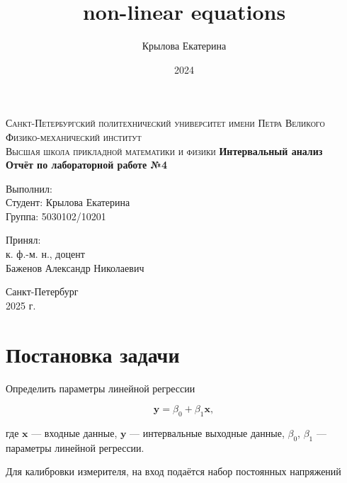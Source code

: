 \documentclass[a4paper,14pt]{article}
\title{non-linear equations}
\author{Крылова Екатерина}
\date{2024}
\begin{document}
	
	\begin{titlepage}
		\begin{center}
			\textsc{
				Санкт-Петербургский политехнический университет имени Петра Великого \\[5mm]
				Физико-механический институт\\[2mm]
				Высшая школа прикладной математики и физики            
			}   
			\vfill
			\textbf{\large
				Интервальный анализ\\
				Отчёт по лабораторной работе №4 \\[3mm]
			}                
		\end{center}
		
		\vfill
		\hfill
		\begin{minipage}{0.5\textwidth}
			Выполнил: \\[2mm]   
			Студент: Крылова Екатерина \\
			Группа: 5030102/10201\\
		\end{minipage}
		
		\hfill
		\begin{minipage}{0.5\textwidth}
			Принял: \\[2mm]
			к. ф.-м. н., доцент \\   
			Баженов Александр Николаевич
		\end{minipage}
		
		\vfill
		\begin{center}
			Санкт-Петербург \\2025 г.
		\end{center}
	\end{titlepage}
	
	\tableofcontents
	\newpage

  \section{Постановка задачи}

  Определить параметры линейной регрессии

  \begin{equation} \label{eq:islau}
    \mathbf{y} = \beta_0 + \beta_1 \mathbf{x},
  \end{equation}

  где \( \mathbf{x} \) --- входные данные, \( \mathbf{y} \) --- интервальные
  выходные данные, \( \beta_0 \), \( \beta_1 \) --- параметры линейной
  регрессии.

  Для калибровки измерителя, на вход подаётся набор постоянных
  напряжений
\end{document}
